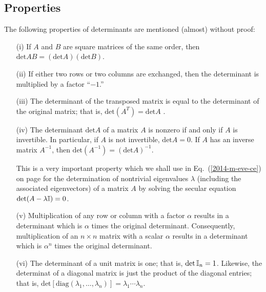 \subsection{Properties}

The following properties of determinants are mentioned (almost) without proof:

\begin{itemize}
\item[(i)]
If $A$ and $B$ are square matrices of the same order, then
$\textrm{det}AB = (\textrm{det}A)  (\textrm{det}B)$.

\item[(ii)]
If either two rows or two columns are exchanged, then the determinant is multiplied
by a factor ``$-1$.''


\item[(iii)]
The determinant of the transposed matrix is equal to the determinant of the original matrix; that is,
$\textrm{det}(A^T) = \textrm{det}A $ .

\item[(iv)]
The determinant $\textrm{det}A $ of a matrix $A$ is nonzero if and only if $A$ is invertible.
In particular, if $A$ is not invertible, $\textrm{det}A =0$.
If $A$ has an inverse matrix $A^{-1}$, then $\textrm{det}(A^{-1}) = (\textrm{det}A)^{-1} $.

This is a very important property which we shall use in Eq.~(\ref{2014-m-eve-ce}) on page \pageref{2014-m-eve-ce}
for the determination of nontrivial
eigenvalues $\lambda$ (including the associated eigenvectors)
of a matrix $A$ by solving the secular equation $\textrm{det} (A-\lambda {\Bbb I})=0 $.



\item[(v)]
Multiplication of any row or column with a factor $\alpha$  results in a determinant
which is $\alpha$ times the original determinant.
Consequently,
multiplication of an $n \times n$ matrix with a scalar $\alpha$ results
in a   determinant
which is $\alpha^n$ times the original determinant.

\item[(vi)]
The determinant of a unit matrix is one; that is,
$\textrm{det} \, {\Bbb I}_n =1$.
Likewise, the determinat of a diagonal matrix is just the product of the diagonal entries;
that is,
$\textrm{det} [\textrm{diag}(\lambda_1,\ldots, \lambda_n)] = \lambda_1 \cdots \lambda_n$.


\end{itemize}
